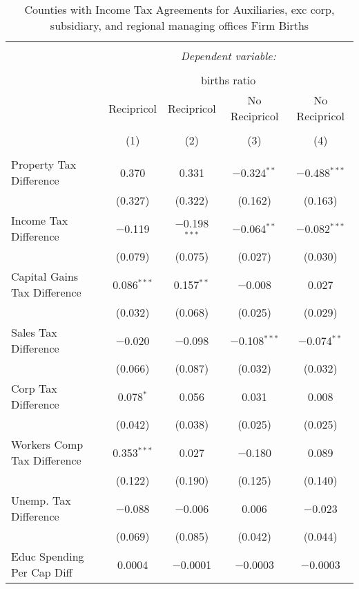 
\begin{table}[!htbp] \centering 
  \caption{Counties with Income Tax Agreements for  Auxiliaries, exc corp, subsidiary, and regional managing offices Firm Births} 
  \label{95agreement} 
\begin{tabular}{@{\extracolsep{5pt}}lcccc} 
\\[-1.8ex]\hline 
\hline \\[-1.8ex] 
 & \multicolumn{4}{c}{\textit{Dependent variable:}} \\ 
\cline{2-5} 
\\[-1.8ex] & \multicolumn{4}{c}{births ratio} \\ 
 & Recipricol & Recipricol & No Recipricol & No Recipricol \\ 
\\[-1.8ex] & (1) & (2) & (3) & (4)\\ 
\hline \\[-1.8ex] 
 Property Tax Difference & 0.370 & 0.331 & $-$0.324$^{**}$ & $-$0.488$^{***}$ \\ 
  & (0.327) & (0.322) & (0.162) & (0.163) \\ 
  Income Tax Difference & $-$0.119 & $-$0.198$^{***}$ & $-$0.064$^{**}$ & $-$0.082$^{***}$ \\ 
  & (0.079) & (0.075) & (0.027) & (0.030) \\ 
  Capital Gains Tax Difference & 0.086$^{***}$ & 0.157$^{**}$ & $-$0.008 & 0.027 \\ 
  & (0.032) & (0.068) & (0.025) & (0.029) \\ 
  Sales Tax Difference & $-$0.020 & $-$0.098 & $-$0.108$^{***}$ & $-$0.074$^{**}$ \\ 
  & (0.066) & (0.087) & (0.032) & (0.032) \\ 
  Corp Tax Difference & 0.078$^{*}$ & 0.056 & 0.031 & 0.008 \\ 
  & (0.042) & (0.038) & (0.025) & (0.025) \\ 
  Workers Comp Tax Difference & 0.353$^{***}$ & 0.027 & $-$0.180 & 0.089 \\ 
  & (0.122) & (0.190) & (0.125) & (0.140) \\ 
  Unemp. Tax Difference & $-$0.088 & $-$0.006 & 0.006 & $-$0.023 \\ 
  & (0.069) & (0.085) & (0.042) & (0.044) \\ 
  Educ Spending Per Cap Diff & 0.0004 & $-$0.0001 & $-$0.0003 & $-$0.0003 \\ 

\end{tabular}
\end{table}
